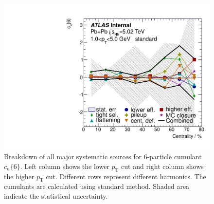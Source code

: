 \begin{figure}[H]
\includegraphics[width=.425\linewidth]{figs/sec_sys/summary/sys_c6_1sub_Har4_Pt1.pdf}
\caption{Breakdown of all major systematic sources for 6-particle cumulant $c_n\{6\}$. Left column shows the lower $p_\text{T}$ cut and right column shows the higher $p_\text{T}$ cut. Different rows represent different harmonics. The cumulants are calculated using standard method. Shaded area indicate the statistical uncertainty.}
\label{fig:sys_sum_c6}
\end{figure}

